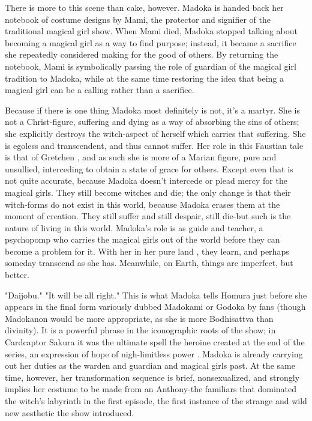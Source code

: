 There is more to this scene than cake, however. Madoka is handed back her notebook of costume designs by Mami, the protector and signifier of the traditional magical girl show. When Mami died, Madoka stopped talking about becoming a magical girl as a way to find purpose; instead, it became a sacrifice she repeatedly considered making for the good of others. By returning the notebook, Mami is symbolically passing the role of guardian of the magical girl tradition to Madoka, while at the same time restoring the idea that being a magical girl can be a calling rather than a sacrifice. 

Because if there is one thing Madoka most definitely is not, it's a martyr. She is not a Christ-figure, suffering and dying as a way of absorbing the sins of others; she explicitly destroys the witch-aspect of herself which carries that suffering. She is egoless and transcendent, and thus cannot suffer. Her role in this Faustian tale is that of Gretchen \cite{ref89}, and as such she is more of a Marian figure, pure and unsullied, interceding to obtain a state of grace for others. Except even that is not quite accurate, because Madoka doesn't intercede or plead mercy for the magical girls. They still become witches and die; the only change is that their witch-forms do not exist in this world, because Madoka erases them at the moment of creation. They still suffer and still despair, still die-but such is the nature of living in this world. Madoka's role is as guide and teacher, a psychopomp who carries the magical girls out of the world before they can become a problem for it. With her in her pure land \cite{ref90}, they learn, and perhaps someday transcend as she has. Meanwhile, on Earth, things are imperfect, but better. 

"Daijobu." "It will be all right." This is what Madoka tells Homura just before she appears in the final form variously dubbed Madokami or Godoka by fans (though Madokanon \cite{ref91} would be more appropriate, as she is more Bodhisattva than divinity). It is a powerful phrase in the iconographic roots of the show; in Cardcaptor Sakura it was the ultimate spell the heroine created at the end of the series, an expression of hope of nigh-limitless power \cite{ref92}. Madoka is already carrying out her duties as the warden and guardian and magical girls past. At the same time, however, her transformation sequence is brief, nonsexualized, and strongly implies her costume to be made from an Anthony-the familiars that dominated the witch's labyrinth in the first episode, the first instance of the strange and wild new aesthetic the show introduced.

